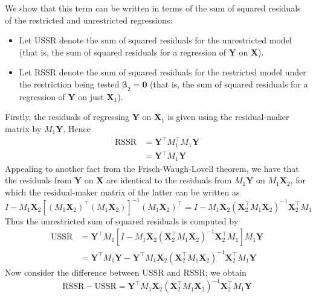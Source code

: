 \documentclass[11pt]{report} %
\begin{document}
We show that this term can be written in terms of the sum of squared residuals of the restricted and unrestricted regressions:
\begin{itemize}
\item Let $\mathrm{USSR}$ denote the sum of squared residuals for the unrestricted model (that is, the sum of squared residuals for a regression of $\mathbf{Y}$ on $\mathbf{X}$).
\item Let $\mathrm{RSSR}$ denote the sum of squared residuals for the restricted model under the restriction being tested $\boldsymbol{\beta}_{2} = \mathbf{0}$ (that is, the sum of squared residuals for a regression of $\mathbf{Y}$ on just $\mathbf{X}_{1}$).
\end{itemize}
Firstly, the residuals of regressing $\mathbf{Y}$ on $\mathbf{X}_{1}$ is given using the residual-maker matrix by $M_{1}\mathbf{Y}$. Hence
\begin{align}
\mathrm{RSSR} &= \mathbf{Y}^{\top}M_{1}^{\top}M_{1}\mathbf{Y} \\
&= \mathbf{Y}^{\top}M_{1}\mathbf{Y}
\end{align}
Appealing to another fact from the Frisch-Waugh-Lovell theorem, we have that the residuals from $\mathbf{Y}$ on $\mathbf{X}$ are identical to the residuals from $M_{1}\mathbf{Y}$ on $M_{1}\mathbf{X}_{2}$, for which the residual-maker matrix of the latter can be written as
\begin{equation}
I - M_{1}\mathbf{X}_{2}\left[\left(M_{1}\mathbf{X}_{2}\right)^{\top}\left(M_{1}\mathbf{X}_{2}\right)\right]^{-1}\left(M_{1}\mathbf{X}_{2}\right)^{\top} = I - M_{1}\mathbf{X}_{2}\left(\mathbf{X}_{2}^{\top}M_{1}\mathbf{X}_{2}\right)^{-1}\mathbf{X}_{2}^{\top}M_{1}
\end{equation}
Thus the unrestricted sum of squared residuals is computed by
\begin{align}
\mathrm{USSR} &= \mathbf{Y}^{\top}M_{1}\left[I - M_{1}\mathbf{X}_{2}\left(\mathbf{X}_{2}^{\top}M_{1}\mathbf{X}_{2}\right)^{-1}\mathbf{X}_{2}^{\top}M_{1}\right]M_{1}\mathbf{Y} \\
&= \mathbf{Y}^{\top}M_{1}\mathbf{Y} - \mathbf{Y}^{\top}M_{1}\mathbf{X}_{2}\left(\mathbf{X}_{2}^{\top}M_{1}\mathbf{X}_{2}\right)^{-1}\mathbf{X}_{2}^{\top}M_{1}\mathbf{Y}
\end{align}
Now consider the difference between $\mathrm{USSR}$ and $\mathrm{RSSR}$; we obtain
\begin{equation}
\mathrm{RSSR} - \mathrm{USSR} = \mathbf{Y}^{\top}M_{1}\mathbf{X}_{2}\left(\mathbf{X}_{2}^{\top}M_{1}\mathbf{X}_{2}\right)^{-1}\mathbf{X}_{2}^{\top}M_{1}\mathbf{Y}
\end{equation}
\end{document}
